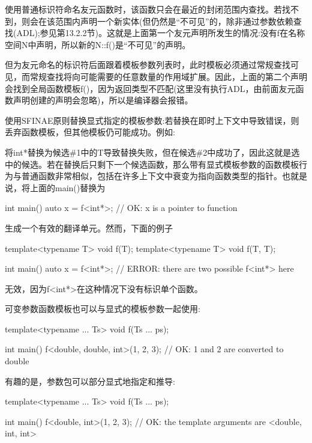 使用普通标识符命名友元函数时，该函数只会在最近的封闭范围内查找。若找不到，则会在该范围内声明一个新实体(但仍然是“不可见”的，除非通过参数依赖查找(ADL);参见第13.2.2节)。这就是上面第一个友元声明所发生的情况:没有f在名称空间N中声明，所以新的N::f()是“不可见”的声明。

但为友元命名的标识符后面跟着模板参数列表时，此时模板必须通过常规查找可见，而常规查找将向可能需要的任意数量的作用域扩展。因此，上面的第二个声明会找到全局函数模板f()，因为返回类型不匹配(这里没有执行ADL，由前面友元函数声明创建的声明会忽略)，所以是编译器会报错。

使用SFINAE原则替换显式指定的模板参数:若替换在即时上下文中导致错误，则丢弃函数模板，但其他模板仍可能成功。例如:


将int*替换为候选\#1中的T导致替换失败，但在候选\#2中成功了，因此这就是选中的候选。若在替换后只剩下一个候选函数，那么带有显式模板参数的函数模板行为与普通函数非常相似，包括在许多上下文中衰变为指向函数类型的指针。也就是说，将上面的main()替换为

\begin{cpp}
int main() {
	auto x = f<int*>; // OK: x is a pointer to function
}
\end{cpp}

生成一个有效的翻译单元。然而，下面的例子

\begin{cpp}
template<typename T> void f(T);
template<typename T> void f(T, T);

int main() {
	auto x = f<int*>; // ERROR: there are two possible f<int*> here
}
\end{cpp}

无效，因为f<int*>在这种情况下没有标识单个函数。

可变参数函数模板也可以与显式的模板参数一起使用:

\begin{cpp}
template<typename ... Ts> void f(Ts ... ps);

int main() {
	f<double, double, int>(1, 2, 3); // OK: 1 and 2 are converted to double
}
\end{cpp}

有趣的是，参数包可以部分显式地指定和推导:

\begin{cpp}
template<typename ... Ts> void f(Ts ... ps);

int main() {
	f<double, int>(1, 2, 3); // OK: the template arguments are <double, int, int>
}
\end{cpp}









